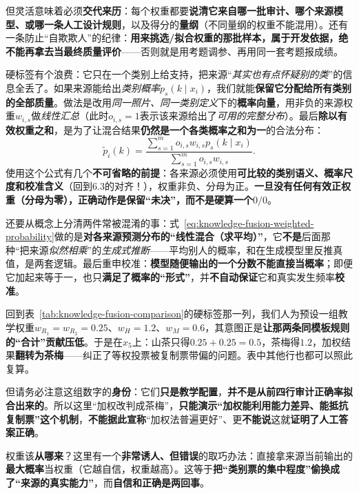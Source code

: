 但灵活意味着必须\textbf{交代来历}：每个权重都要\textbf{说清它来自哪一批审计、哪个来源模型、或哪一条人工设计规则}，以及得分的\textbf{量纲}（不同量纲的权重不能混用）。还有一条防止“自欺欺人”的纪律：\textbf{用来挑选/拟合权重的那批样本，属于开发依据，绝不能再拿去当最终质量评价}——否则就是用考题调参、再用同一套考题报成绩。

硬标签有个浪费：它只在一个类别上给支持，把来源“\emph{其实也有点怀疑别的类}”的信息全丢了。如果来源能给出\emph{类别概率}$p_s(k\mid x_i)$，我们就能\textbf{保留它分配给所有类别的全部质量}。做法是改用\emph{同一照片、同一类别定义}下的\textbf{概率向量}，用非负的来源权重$w_{i,s}$做\emph{线性汇总}（此时$o_{i,s}=1$表示该来源给出了\emph{可用的完整分布}）。最后\textbf{除以有效权重之和}，是为了让混合结果\textbf{仍然是一个各类概率之和为一}的合法分布：
\begin{equation}
  \widetilde p_i(k)
  =\frac{\sum_{s=1}^{m}o_{i,s}w_{i,s}p_s(k\mid x_i)}
  {\sum_{s=1}^{m}o_{i,s}w_{i,s}}.
  \label{eq:knowledge-fusion-weighted-probability}
\end{equation}
使用这个公式有几个\textbf{不可省略的前提}：各来源必须使用\textbf{可比较的类别语义、概率尺度和校准含义}（回到6.3的对齐！），权重非负、分母为正。\textbf{一旦没有任何有效正权重（分母为零），正确动作是保留“未决”，而不是硬算一个$0/0$}。

还要从概念上分清两件常被混淆的事：式~\eqref{eq:knowledge-fusion-weighted-probability}做的是\textbf{对各来源预测分布的“线性混合（求平均）”}，它\textbf{不是}后面那种“把来源\emph{似然相乘}”的\emph{生成式推断}——平均别人的概率，和在生成模型里反推真值，是两套逻辑。最后重申校准：\textbf{模型随便输出的一个分数不能直接当概率}；即便它加起来等于一，也只\textbf{满足了概率的“形式”}，并\textbf{不自动保证}它和真实发生频率\textbf{校准}。

回到表~\ref{tab:knowledge-fusion-comparison}的硬标签那一列，我们人为预设一组教学权重$w_{R_1}=w_{R_2}=0.25$、$w_H=1.2$、$w_M=0.6$，其意图正是\textbf{让那两条同模板规则的“合计”贡献压低}。于是在$x_5$上：山茶只得$0.25+0.25=0.5$，茶梅得$1.2$，加权结果\textbf{翻转为茶梅}——纠正了等权投票被复制票带偏的问题。表中其他行也都可以照此复算。

但请务必注意这组数字的\textbf{身份}：它们\textbf{只是教学配置}，\textbf{并不是从前四行审计正确率拟合出来的}。所以这里“加权改判成茶梅”，\textbf{只能演示“加权能利用能力差异、能抵抗复制票”这个机制}，\textbf{不能据此宣称}“加权法普遍更好”、更\textbf{不能说}这就\textbf{证明了人工答案正确}。

权重该\textbf{从哪来}？这里有一个\textbf{非常诱人、但错误}的取巧办法：直接拿来源当前输出的\textbf{最大概率}当权重（它越自信，权重越高）。这等于\textbf{把“类别票的集中程度”偷换成了“来源的真实能力”}，而\textbf{自信和正确是两回事}。


